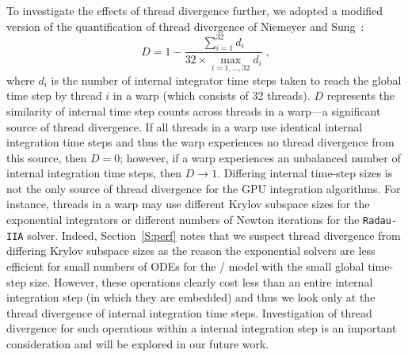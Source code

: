 \documentclass[preprint,review,11pt]{elsarticle}
\begin{document}
To investigate the effects of thread divergence further, we adopted a modified version of the quantification of thread divergence of Niemeyer and Sung~\cite{Niemeyer:2014aa}:
\begin{equation}
	D = 1 - \frac{\sum_{i=1}^{32}{d_i}}{32 \times \max\limits_{i = 1, \dots, 32} d_i} \;,
	\label{eqn:divergence}
\end{equation}
where $d_i$ is the number of internal integrator time steps taken to reach the global time step by thread $i$ in a warp (which consists of 32 threads).
$D$ represents the similarity of internal time step counts across threads in a warp---a significant source of thread divergence.
If all threads in a warp use identical internal integration time steps and thus the warp experiences no thread divergence from this source, then $D = 0$; however, if a warp experiences an unbalanced number of internal integration time steps, then $D \to 1$.
Differing internal time-step sizes is not the only source of thread divergence for the GPU integration algorithms.
For instance, threads in a warp may use different Krylov subspace sizes for the exponential integrators or different numbers of Newton iterations for the \texttt{Radau-IIA} solver.
Indeed, Section~\ref{S:perf} notes that we suspect thread divergence from differing Krylov subspace sizes as the reason the exponential solvers are less efficient for small numbers of ODEs for the \slash{} model with the small global time-step size.
However, these operations clearly cost less than an entire internal integration step (in which they are embedded) and thus we look only at the thread divergence of internal integration time steps.
Investigation of thread divergence for such operations within a internal integration step is an important consideration and will be explored in our future work.
\end{document}
